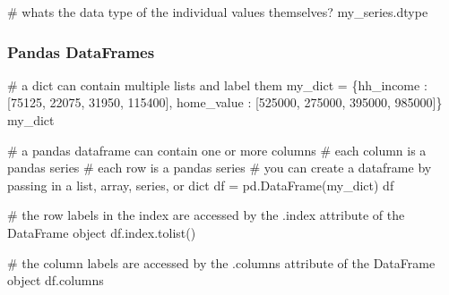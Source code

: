 \documentclass[
  letterpaper,
  DIV=11,
  numbers=noendperiod]{scrreprt}
\newenvironment{Shaded}{\begin{snugshade}}{\end{snugshade}}
\newcommand{\CommentTok}[1]{\textcolor[rgb]{0.37,0.37,0.37}{#1}}
\newcommand{\DecValTok}[1]{\textcolor[rgb]{0.68,0.00,0.00}{#1}}
\newcommand{\NormalTok}[1]{\textcolor[rgb]{0.00,0.23,0.31}{#1}}
\newcommand{\OperatorTok}[1]{\textcolor[rgb]{0.37,0.37,0.37}{#1}}
\newcommand{\StringTok}[1]{\textcolor[rgb]{0.13,0.47,0.30}{#1}}
\begin{document}
\begin{Shaded}
\begin{Highlighting}[]
\CommentTok{\# what\textquotesingle{}s the data type of the individual values themselves?}
\NormalTok{my\_series.dtype}
\end{Highlighting}
\end{Shaded}

\subsubsection{Pandas DataFrames}\label{pandas-dataframes}

\begin{Shaded}
\begin{Highlighting}[]
\CommentTok{\# a dict can contain multiple lists and label them}
\NormalTok{my\_dict }\OperatorTok{=}\NormalTok{ \{}\StringTok{\textquotesingle{}hh\_income\textquotesingle{}}\NormalTok{  : [}\DecValTok{75125}\NormalTok{, }\DecValTok{22075}\NormalTok{, }\DecValTok{31950}\NormalTok{, }\DecValTok{115400}\NormalTok{],}
           \StringTok{\textquotesingle{}home\_value\textquotesingle{}}\NormalTok{ : [}\DecValTok{525000}\NormalTok{, }\DecValTok{275000}\NormalTok{, }\DecValTok{395000}\NormalTok{, }\DecValTok{985000}\NormalTok{]\}}
\NormalTok{my\_dict}
\end{Highlighting}
\end{Shaded}

\begin{Shaded}
\begin{Highlighting}[]
\CommentTok{\# a pandas dataframe can contain one or more columns}
\CommentTok{\# each column is a pandas series}
\CommentTok{\# each row is a pandas series}
\CommentTok{\# you can create a dataframe by passing in a list, array, series, or dict}
\NormalTok{df }\OperatorTok{=}\NormalTok{ pd.DataFrame(my\_dict)}
\NormalTok{df}
\end{Highlighting}
\end{Shaded}

\begin{Shaded}
\begin{Highlighting}[]
\CommentTok{\# the row labels in the index are accessed by the .index attribute of the DataFrame object}
\NormalTok{df.index.tolist()}
\end{Highlighting}
\end{Shaded}

\begin{Shaded}
\begin{Highlighting}[]
\CommentTok{\# the column labels are accessed by the .columns attribute of the DataFrame object}
\NormalTok{df.columns}
\end{Highlighting}
\end{Shaded}
\end{document}
